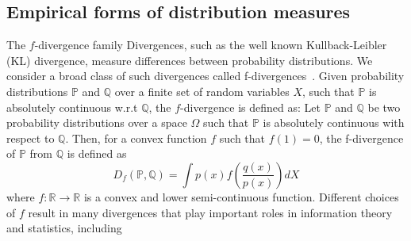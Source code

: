 % 
% 



% 

\subsection{Empirical forms of distribution measures}
The $f$-divergence family Divergences, such as the well known Kullback-Leibler (KL) divergence, measure differences between probability distributions. We consider a broad class of such divergences called f-divergences~\citep{liese2006divergences}. Given probability distributions $\mathbb{P}$ and $\mathbb{Q}$ over a finite set of random variables $X$, such that $\mathbb{P}$ is absolutely continuous w.r.t $\mathbb{Q}$, the $f$-divergence is defined as: 
Let $\mathbb{P}$ and $\mathbb{Q}$ be two probability distributions over a space $\Omega$ such that $\mathbb{P}$ is absolutely continuous with respect to $\mathbb{Q}$. 
Then, for a convex function $f$ such that $f(1) = 0$, the f-divergence of $\mathbb{P}$ from $\mathbb{Q}$ is defined as
\begin{equation*}
D_f (\mathbb{P}, \mathbb{Q}) = \int p(x) f(\frac{q(x)}{p(x)}) dX
\end{equation*}
where $f: \mathbb{R}\rightarrow\mathbb{R}$ is a convex and lower semi-continuous function. 
Different choices of $f$ result in many divergences that play important roles in information theory and statistics, including

